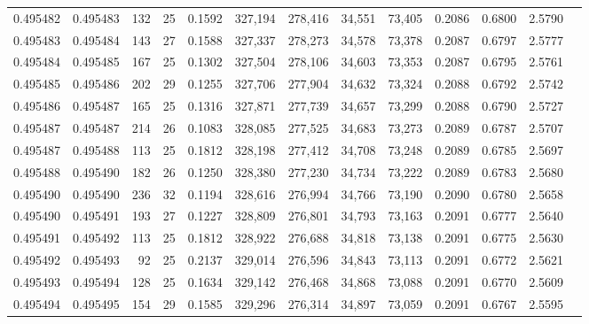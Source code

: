 \begin{tabular}{rrrrrrrrrrrrr}
0.495482 & 0.495483 & 132 &  25 &                                     0.1592 & 327,194 & 278,416 &  34,551 &  73,405 & 0.2086 & 0.6800 & 2.5790 \\
0.495483 & 0.495484 & 143 &  27 &                                     0.1588 & 327,337 & 278,273 &  34,578 &  73,378 & 0.2087 & 0.6797 & 2.5777 \\
0.495484 & 0.495485 & 167 &  25 &                                     0.1302 & 327,504 & 278,106 &  34,603 &  73,353 & 0.2087 & 0.6795 & 2.5761 \\
0.495485 & 0.495486 & 202 &  29 &                                     0.1255 & 327,706 & 277,904 &  34,632 &  73,324 & 0.2088 & 0.6792 & 2.5742 \\
0.495486 & 0.495487 & 165 &  25 &                                     0.1316 & 327,871 & 277,739 &  34,657 &  73,299 & 0.2088 & 0.6790 & 2.5727 \\
0.495487 & 0.495487 & 214 &  26 &                                     0.1083 & 328,085 & 277,525 &  34,683 &  73,273 & 0.2089 & 0.6787 & 2.5707 \\
0.495487 & 0.495488 & 113 &  25 &                                     0.1812 & 328,198 & 277,412 &  34,708 &  73,248 & 0.2089 & 0.6785 & 2.5697 \\
0.495488 & 0.495490 & 182 &  26 &                                     0.1250 & 328,380 & 277,230 &  34,734 &  73,222 & 0.2089 & 0.6783 & 2.5680 \\
0.495490 & 0.495490 & 236 &  32 &                                     0.1194 & 328,616 & 276,994 &  34,766 &  73,190 & 0.2090 & 0.6780 & 2.5658 \\
0.495490 & 0.495491 & 193 &  27 &                                     0.1227 & 328,809 & 276,801 &  34,793 &  73,163 & 0.2091 & 0.6777 & 2.5640 \\
0.495491 & 0.495492 & 113 &  25 &                                     0.1812 & 328,922 & 276,688 &  34,818 &  73,138 & 0.2091 & 0.6775 & 2.5630 \\
0.495492 & 0.495493 &  92 &  25 &                                     0.2137 & 329,014 & 276,596 &  34,843 &  73,113 & 0.2091 & 0.6772 & 2.5621 \\
0.495493 & 0.495494 & 128 &  25 &                                     0.1634 & 329,142 & 276,468 &  34,868 &  73,088 & 0.2091 & 0.6770 & 2.5609 \\
0.495494 & 0.495495 & 154 &  29 &                                     0.1585 & 329,296 & 276,314 &  34,897 &  73,059 & 0.2091 & 0.6767 & 2.5595 \\

\end{tabular}
